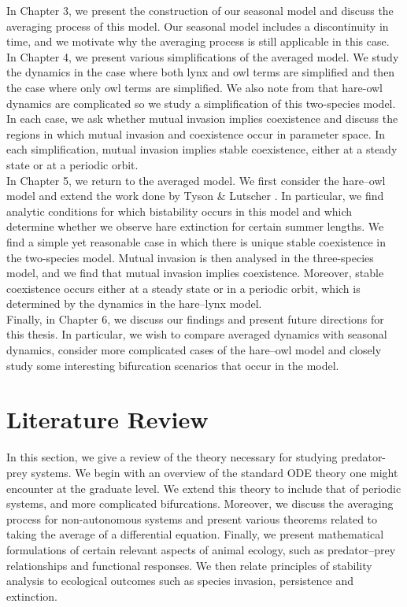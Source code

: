 \documentclass[12pt]{UOthesis}
\theoremstyle{remarkstyle}
\begin{document}
In Chapter 3, we present the construction of our seasonal model and discuss the averaging process of this model. Our seasonal model includes a discontinuity in time, and we motivate why the averaging process is still applicable in this case.\\

In Chapter 4, we present various simplifications of the averaged model. We study the dynamics in the case where both lynx and owl terms are simplified and then the case where only owl terms are simplified. We also note from \cite{TysonLutscher} that hare-owl dynamics are complicated so we study a simplification of this two-species model. In each case, we ask whether mutual invasion implies coexistence and discuss the regions in which mutual invasion and coexistence occur in parameter space. In each simplification, mutual invasion implies stable coexistence, either at a steady state or at a periodic orbit.\\

In Chapter 5, we return to the averaged model. We first consider the hare--owl model and extend the work done by Tyson \& Lutscher \cite{TysonLutscher}. In particular, we find analytic conditions for which bistability occurs in this model and which determine whether we observe hare extinction for certain summer lengths. We find a simple yet reasonable case in which there is unique stable coexistence in the two-species model. Mutual invasion is then analysed in the three-species model, and we find that mutual invasion implies coexistence. Moreover, stable coexistence occurs either at a steady state or in a periodic orbit, which is determined by the dynamics in the hare--lynx model.\\

Finally, in Chapter 6, we discuss our findings and present future directions for this thesis. In particular, we wish to compare averaged dynamics with seasonal dynamics, consider more complicated cases of the hare--owl model and closely study some interesting bifurcation scenarios that occur in the model.
\cleardoublepage

\chapter{Literature Review}
\label{ChapterLitReview}

In this section, we give a review of the theory necessary for studying predator-prey systems. We begin with an overview of the standard ODE theory one might encounter at the graduate level. We extend this theory to include that of periodic systems, and more complicated bifurcations. Moreover, we discuss the averaging process for non-autonomous systems and present various theorems related to taking the average of a differential equation. Finally, we present mathematical formulations of certain relevant aspects of animal ecology, such as predator--prey relationships and functional responses. We then relate principles of stability analysis to ecological outcomes such as species invasion, persistence and extinction.
\end{document}
